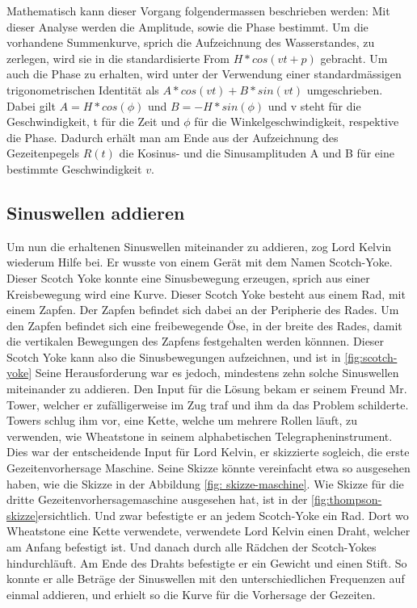 Mathematisch kann dieser Vorgang folgendermassen beschrieben werden:
Mit dieser Analyse werden die Amplitude, sowie die Phase bestimmt.
Um die vorhandene Summenkurve, sprich die Aufzeichnung des Wasserstandes, zu zerlegen, wird sie in die standardisierte From $H*cos(vt+p)$ gebracht.
Um auch die Phase zu erhalten, wird unter der Verwendung einer standardmässigen trigonometrischen Identität als $A*cos(vt)+B*sin(vt)$ umgeschrieben.
Dabei gilt $A=H*cos(\phi)$ und $B=-H*sin(\phi)$ und v steht für die Geschwindigkeit, t für die Zeit und $\phi$ für die Winkelgeschwindigkeit, respektive die Phase.
Dadurch erhält man am Ende aus der Aufzeichnung des Gezeitenpegels $R(t)$ die Kosinus- und die Sinusamplituden A und B für eine bestimmte Geschwindigkeit $v$.


\subsection{Sinuswellen addieren}

Um nun die erhaltenen Sinuswellen miteinander zu addieren, zog Lord Kelvin wiederum Hilfe bei.
Er wusste von einem Gerät mit dem Namen Scotch-Yoke.
Dieser Scotch Yoke konnte eine Sinusbewegung erzeugen, sprich aus einer Kreisbewegung wird eine Kurve.
Dieser Scotch Yoke besteht aus einem Rad, mit einem Zapfen.
Der Zapfen befindet sich dabei an der Peripherie des Rades.
Um den Zapfen befindet sich eine freibewegende Öse, in der breite des Rades, damit die vertikalen Bewegungen des Zapfens festgehalten werden könnnen.
Dieser Scotch Yoke kann also die Sinusbewegungen aufzeichnen, und ist in \ref{fig:scotch-yoke}
Seine Herausforderung war es jedoch, mindestens zehn solche Sinuswellen miteinander zu addieren.
Den Input für die Lösung bekam er seinem Freund Mr. Tower, welcher er zufälligerweise im Zug traf und ihm da das Problem schilderte.
Towers schlug ihm vor, eine Kette, welche um mehrere Rollen läuft, zu verwenden, wie Wheatstone in seinem alphabetischen Telegrapheninstrument.
Dies war der entscheidende Input für Lord Kelvin, er skizzierte sogleich, die erste Gezeitenvorhersage Maschine. Seine Skizze könnte vereinfacht etwa so ausgesehen haben, wie die Skizze in der Abbildung \ref{fig: skizze-maschine}.
Wie Skizze für die dritte Gezeitenvorhersagemaschine ausgesehen hat, ist in der \ref{fig:thompson-skizze}ersichtlich. 
Und zwar befestigte er an jedem Scotch-Yoke ein Rad.
Dort wo Wheatstone eine Kette verwendete, verwendete Lord Kelvin einen Draht, welcher am Anfang befestigt ist.
Und danach durch alle Rädchen der Scotch-Yokes hindurchläuft.
Am Ende des Drahts befestigte er ein Gewicht und einen Stift.
So konnte er alle Beträge der Sinuswellen mit den unterschiedlichen Frequenzen auf einmal addieren, und erhielt so die Kurve für die Vorhersage der Gezeiten.

